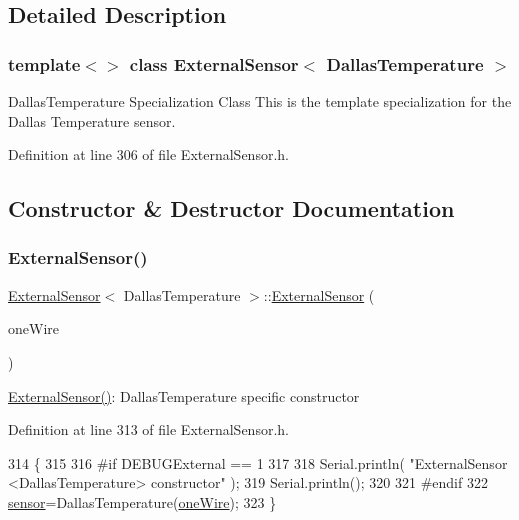 \subsection{Detailed Description}
\subsubsection*{template$<$$>$\newline
class External\+Sensor$<$ Dallas\+Temperature $>$}

Dallas\+Temperature Specialization Class This is the template specialization for the Dallas Temperature sensor. 

Definition at line 306 of file External\+Sensor.\+h.



\subsection{Constructor \& Destructor Documentation}
\mbox{\label{class_external_sensor_3_01_dallas_temperature_01_4_a5de0c37120d2d927bd0f37ff4a215baf}} 
\subsubsection{\texorpdfstring{External\+Sensor()}{ExternalSensor()}}
{\footnotesize\ttfamily \hyperlink{class_external_sensor}{External\+Sensor}$<$ Dallas\+Temperature $>$\+::\hyperlink{class_external_sensor}{External\+Sensor} (\begin{DoxyParamCaption}\item[{One\+Wire $\ast$}]{one\+Wire }\end{DoxyParamCaption})\hspace{0.3cm}{\ttfamily [inline]}}

\hyperlink{class_external_sensor_3_01_dallas_temperature_01_4_a5de0c37120d2d927bd0f37ff4a215baf}{External\+Sensor()}\+: Dallas\+Temperature specific constructor 

Definition at line 313 of file External\+Sensor.\+h.


\begin{DoxyCode}
314     \{
315         
316 \textcolor{preprocessor}{    #if DEBUGExternal == 1 }
317 
318         Serial.println( \textcolor{stringliteral}{"ExternalSensor <DallasTemperature> constructor"} );
319         Serial.println();
320     
321 \textcolor{preprocessor}{    #endif}
322         \hyperlink{class_external_sensor_3_01_dallas_temperature_01_4_adb6ba4fcdedef95ad8f6b0c9b6c0f9d1}{sensor}=DallasTemperature(\hyperlink{_external_sensors_8cpp_af39fa3dad1ba161b384c0b26b8145e65}{oneWire});
323     \}
\end{DoxyCode}


